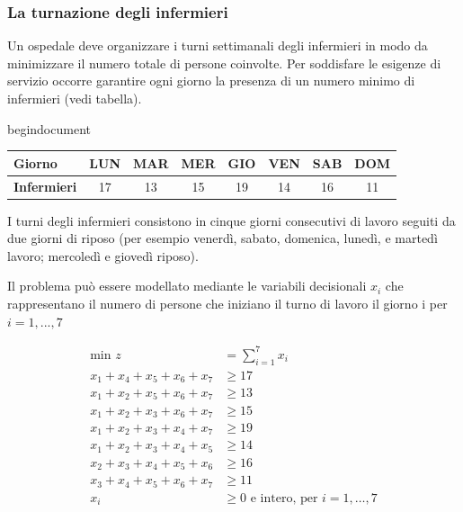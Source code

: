 \documentclass[a4paper, 11pt]{article}
\begin{document}
            
            \subsubsection*{La turnazione degli infermieri}
            Un ospedale deve organizzare i turni settimanali degli infermieri in modo da minimizzare il numero totale di persone coinvolte. Per soddisfare le esigenze di servizio occorre garantire ogni giorno la presenza di un numero minimo di infermieri (vedi tabella).

            begin{document}

            \begin{table}[ht]
                \centering
                \begin{tabular}{|l|*{7}{c|}}
                \hline
                \textbf{Giorno}     & \textbf{LUN} & \textbf{MAR} & \textbf{MER} & \textbf{GIO} & \textbf{VEN} & \textbf{SAB} & \textbf{DOM} \\ \hline
                \textbf{Infermieri} & 17           & 13           & 15           & 19           & 14           & 16           & 11           \\ \hline
                \end{tabular}
            \end{table}

            I turni degli infermieri consistono in cinque giorni consecutivi di lavoro seguiti da due giorni di riposo (per esempio venerdì, sabato, domenica, lunedì, e martedì lavoro; mercoledì e giovedì
            riposo).


            Il problema può essere modellato mediante le variabili decisionali $x_{i}$ che rappresentano il numero di persone che iniziano il turno di lavoro il giorno i per $i=1,...,7$
            
            \begin{align*}
                \text{min } z &= \sum_{i=1}^{7} x_i \\
                x_1 + x_4 + x_5 + x_6 + x_7 &\ge 17 \\
                x_1 + x_2 + x_5 + x_6 + x_7 &\ge 13 \\
                x_1 + x_2 + x_3 + x_6 + x_7 &\ge 15 \\
                x_1 + x_2 + x_3 + x_4 + x_7 &\ge 19 \\
                x_1 + x_2 + x_3 + x_4 + x_5 &\ge 14 \\
                x_2 + x_3 + x_4 + x_5 + x_6 &\ge 16 \\
                x_3 + x_4 + x_5 + x_6 + x_7 &\ge 11 \\
                x_i &\ge 0 \text{ e intero, per } i = 1,\ldots,7
            \end{align*}
            
\end{document}
